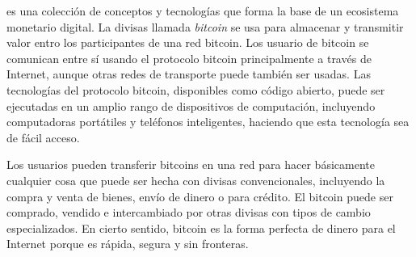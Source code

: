 \documentclass[10pt,journal,compsoc]{IEEEtran}
\begin{document}




% 
% 
% 
% 


 es una colección de conceptos y tecnologías que forma la base de un ecosistema monetario digital. La divisas llamada \emph{bitcoin} se usa para almacenar y transmitir valor entro los participantes de una red bitcoin. Los usuario de bitcoin se comunican entre sí usando el protocolo bitcoin principalmente a través de Internet, aunque otras redes de transporte puede también ser usadas. Las tecnologías del protocolo bitcoin, disponibles como código abierto, puede ser ejecutadas en un amplio rango de dispositivos de computación, incluyendo computadoras portátiles y teléfonos inteligentes, haciendo que esta tecnología sea de fácil acceso.

Los usuarios pueden transferir bitcoins en una red para hacer básicamente cualquier cosa que puede ser hecha con divisas convencionales, incluyendo la compra y venta de bienes, envío de dinero o para crédito. El bitcoin puede ser comprado, vendido e intercambiado por otras divisas con tipos de cambio especializados. En cierto sentido, bitcoin es la forma perfecta de dinero para el Internet porque es rápida, segura y sin fronteras.
\end{document}
